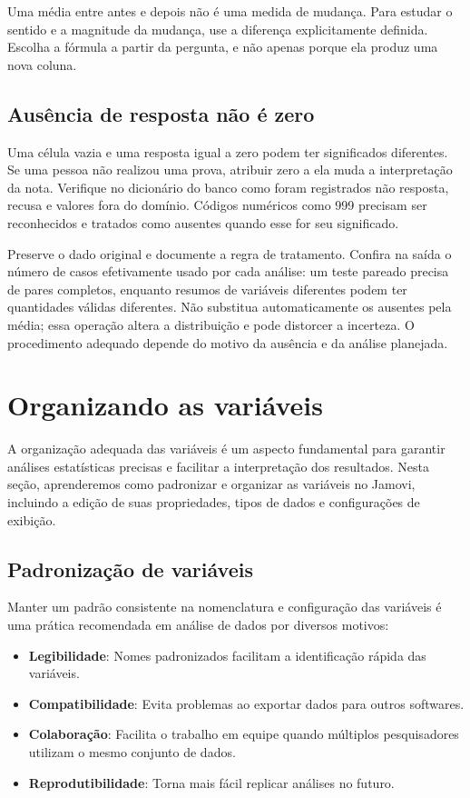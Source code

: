 Uma média entre antes e depois não é uma medida de mudança. Para estudar o sentido e a magnitude da mudança, use a diferença explicitamente definida. Escolha a fórmula a partir da pergunta, e não apenas porque ela produz uma nova coluna.

\subsection{Ausência de resposta não é zero}

Uma célula vazia e uma resposta igual a zero podem ter significados diferentes. Se uma pessoa não realizou uma prova, atribuir zero a ela muda a interpretação da nota. Verifique no dicionário do banco como foram registrados não resposta, recusa e valores fora do domínio. Códigos numéricos como 999 precisam ser reconhecidos e tratados como ausentes quando esse for seu significado.

Preserve o dado original e documente a regra de tratamento. Confira na saída o número de casos efetivamente usado por cada análise: um teste pareado precisa de pares completos, enquanto resumos de variáveis diferentes podem ter quantidades válidas diferentes. Não substitua automaticamente os ausentes pela média; essa operação altera a distribuição e pode distorcer a incerteza. O procedimento adequado depende do motivo da ausência e da análise planejada.

\section{Organizando as variáveis}

A organização adequada das variáveis é um aspecto fundamental para garantir análises estatísticas precisas e facilitar a interpretação dos resultados. Nesta seção, aprenderemos como padronizar e organizar as variáveis no Jamovi, incluindo a edição de suas propriedades, tipos de dados e configurações de exibição.

\subsection{Padronização de variáveis}

Manter um padrão consistente na nomenclatura e configuração das variáveis é uma prática recomendada em análise de dados por diversos motivos:

\begin{itemize}
    \item \textbf{Legibilidade}: Nomes padronizados facilitam a identificação rápida das variáveis.
    \item \textbf{Compatibilidade}: Evita problemas ao exportar dados para outros softwares.
    \item \textbf{Colaboração}: Facilita o trabalho em equipe quando múltiplos pesquisadores utilizam o mesmo conjunto de dados.
    \item \textbf{Reprodutibilidade}: Torna mais fácil replicar análises no futuro.
\end{itemize}

